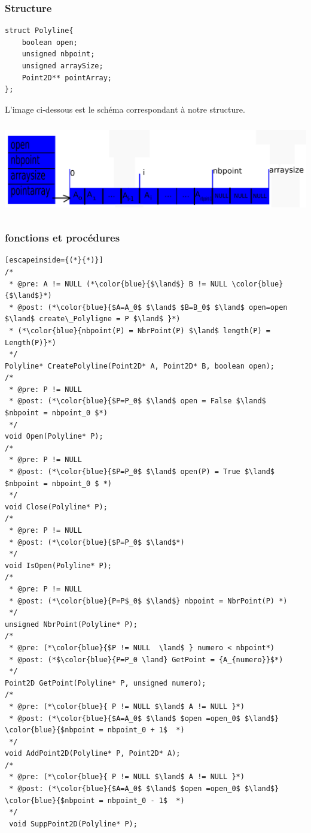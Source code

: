 \documentclass[a4paper, 11pt, oneside]{article}
\begin{document}
\subsubsection{Structure}

\begin{lstlisting}
struct Polyline{
	boolean open;
	unsigned nbpoint;
	unsigned arraySize;
	Point2D** pointArray;
};
\end{lstlisting}

L'image ci-dessous est le schéma correspondant à notre structure.

\includegraphics[height=4cm, width=14cm]{tab1.png}

\subsubsection{fonctions et procédures}

\begin{lstlisting}[escapeinside={(*}{*)}]
/* 
 * @pre: A != NULL (*\color{blue}{$\land$} B != NULL \color{blue}{$\land$}*)
 * @post: (*\color{blue}{$A=A_0$ $\land$ $B=B_0$ $\land$ open=open $\land$ create\_Polyligne = P $\land$ }*)
 * (*\color{blue}{nbpoint(P) = NbrPoint(P) $\land$ length(P) = Length(P)}*)
 */
Polyline* CreatePolyline(Point2D* A, Point2D* B, boolean open);
/* 
 * @pre: P != NULL 
 * @post: (*\color{blue}{$P=P_0$ $\land$ open = False $\land$  $nbpoint = nbpoint_0 $*)
 */
void Open(Polyline* P);
/* 
 * @pre: P != NULL 
 * @post: (*\color{blue}{$P=P_0$ $\land$ open(P) = True $\land$ $nbpoint = nbpoint_0 $ *)
 */
void Close(Polyline* P);
/* 
 * @pre: P != NULL 
 * @post: (*\color{blue}{$P=P_0$ $\land$*)
 */
void IsOpen(Polyline* P);
/* 
 * @pre: P != NULL
 * @post: (*\color{blue}{P=P$_0$ $\land$} nbpoint = NbrPoint(P) *)
 */
unsigned NbrPoint(Polyline* P);
/* 
 * @pre: (*\color{blue}{$P != NULL  \land$ } numero < nbpoint*)
 * @post: (*$\color{blue}{P=P_0 \land} GetPoint = {A_{numero}}$*)
 */
Point2D GetPoint(Polyline* P, unsigned numero);
/*
 * @pre: (*\color{blue}{ P != NULL $\land$ A != NULL }*)
 * @post: (*\color{blue}{$A=A_0$ $\land$ $open =open_0$ $\land$} \color{blue}{$nbpoint = nbpoint_0 + 1$  *)
 */
void AddPoint2D(Polyline* P, Point2D* A);
/*
 * @pre: (*\color{blue}{ P != NULL $\land$ A != NULL }*)
 * @post: (*\color{blue}{$A=A_0$ $\land$ $open =open_0$ $\land$} \color{blue}{$nbpoint = nbpoint_0 - 1$  *)
 */
 void SuppPoint2D(Polyline* P);
\end{lstlisting}
\end{document}
